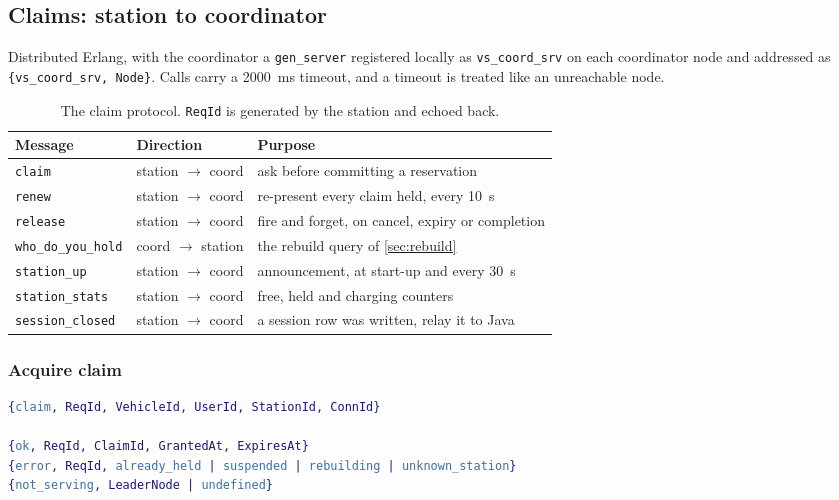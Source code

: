 \subsection{Claims: station to coordinator}
\label{sec:api-claim}

Distributed Erlang, with the coordinator a \texttt{gen\_server} registered locally as
\texttt{vs\_coord\_srv} on each coordinator node and addressed as
\texttt{\{vs\_coord\_srv, Node\}}. Calls carry a 2000~ms timeout, and a timeout is treated like an unreachable node.

\begin{table}[h]
\centering\small
\renewcommand{\arraystretch}{1.15}
\caption{The claim protocol. \texttt{ReqId} is generated by the station and echoed back.}
\label{tab:claim}
\begin{tabularx}{\textwidth}{@{}>{\raggedright\arraybackslash}p{3.3cm} l X@{}}
\toprule
Message & Direction & Purpose \\
\midrule
\texttt{claim} & station $\to$ coord & ask before committing a reservation \\
\texttt{renew} & station $\to$ coord & re-present every claim held, every 10~s \\
\texttt{release} & station $\to$ coord & fire and forget, on cancel, expiry or completion \\
\texttt{who\_do\_you\_hold} & coord $\to$ station & the rebuild query of \cref{sec:rebuild} \\
\texttt{station\_up} & station $\to$ coord & announcement, at start-up and every 30~s \\
\texttt{station\_stats} & station $\to$ coord & free, held and charging counters \\
\texttt{session\_closed} & station $\to$ coord & a session row was written, relay it to Java \\
\bottomrule
\end{tabularx}
\end{table}

\subsubsection{Acquire claim}

\begin{lstlisting}[language=Erlang, caption={Request and the four possible replies.},
                   label={lst:claim}]
{claim, ReqId, VehicleId, UserId, StationId, ConnId}

{ok, ReqId, ClaimId, GrantedAt, ExpiresAt}
{error, ReqId, already_held | suspended | rebuilding | unknown_station}
{not_serving, LeaderNode | undefined}
\end{lstlisting}

